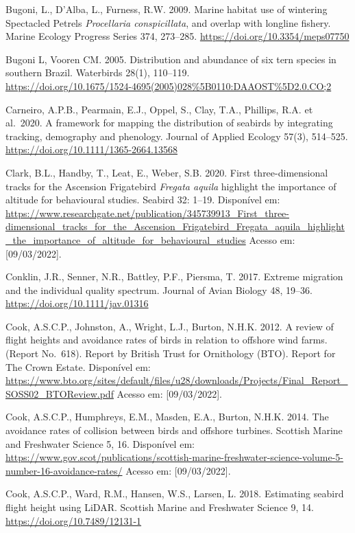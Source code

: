 \documentclass[
  oneside]{scrbook}
\begin{document}
Bugoni, L., D'Alba, L., Furness, R.W. 2009. Marine habitat use of wintering Spectacled Petrels \emph{Procellaria conspicillata}, and overlap with longline fishery. Marine Ecology Progress Series 374, 273--285. \url{https://doi.org/10.3354/meps07750}

Bugoni L, Vooren CM. 2005. Distribution and abundance of six tern species in southern Brazil. Waterbirds 28(1), 110--119.\\
\url{https://doi.org/10.1675/1524-4695(2005)028\%5B0110:DAAOST\%5D2.0.CO;2}

Carneiro, A.P.B., Pearmain, E.J., Oppel, S., Clay, T.A., Phillips, R.A. et al.~2020. A framework for mapping the distribution of seabirds by integrating tracking, demography and phenology. Journal of Applied Ecology 57(3), 514--525. \url{https://doi.org/10.1111/1365-2664.13568}

Clark, B.L., Handby, T., Leat, E., Weber, S.B. 2020. First three-dimensional tracks for the Ascension Frigatebird \emph{Fregata aquila} highlight the importance of altitude for behavioural studies. Seabird 32: 1--19. Disponível em: \url{https://www.researchgate.net/publication/345739913_First_three-dimensional_tracks_for_the_Ascension_Frigatebird_Fregata_aquila_highlight_the_importance_of_altitude_for_behavioural_studies} Acesso em: {[}09/03/2022{]}.

Conklin, J.R., Senner, N.R., Battley, P.F., Piersma, T. 2017. Extreme migration and the individual quality spectrum. Journal of Avian Biology 48, 19--36. \url{https://doi.org/10.1111/jav.01316}

Cook, A.S.C.P., Johnston, A., Wright, L.J., Burton, N.H.K. 2012. A review of flight heights and avoidance rates of birds in relation to offshore wind farms. (Report No.~618). Report by British Trust for Ornithology (BTO). Report for The Crown Estate. Disponível em: \url{https://www.bto.org/sites/default/files/u28/downloads/Projects/Final_Report_SOSS02_BTOReview.pdf} Acesso em: {[}09/03/2022{]}.

Cook, A.S.C.P., Humphreys, E.M., Masden, E.A., Burton, N.H.K. 2014. The avoidance rates of collision between birds and offshore turbines. Scottish Marine and Freshwater Science 5, 16. Disponível em: \url{https://www.gov.scot/publications/scottish-marine-freshwater-science-volume-5-number-16-avoidance-rates/} Acesso em: {[}09/03/2022{]}.

Cook, A.S.C.P., Ward, R.M., Hansen, W.S., Larsen, L. 2018. Estimating seabird flight height using LiDAR. Scottish Marine and Freshwater Science 9, 14. \url{https://doi.org/10.7489/12131-1}
\end{document}
